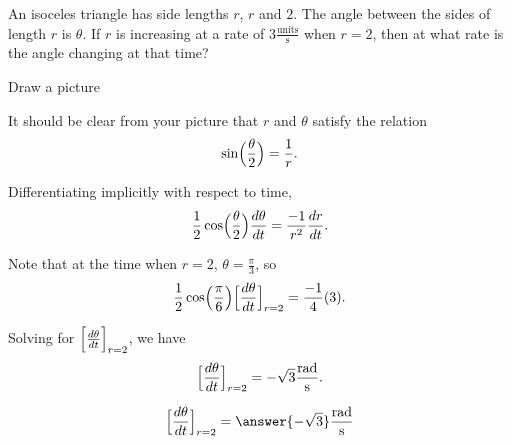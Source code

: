 \documentclass{ximera}
\author{Steven Gubkin\and Nela Lakos}
\begin{document}
\begin{exercise}

An isoceles triangle has side lengths $r$, $r$ and $2$.  The angle
between the sides of length $r$ is $\theta$.  If $r$ is increasing at
a rate of $3 \frac{\textrm{units}}{\textrm{s}}$ when $r = 2$, then at
what rate is the angle changing at that time?

\begin{hint}
  Draw a picture
\end{hint}

\begin{hint}
  It should be clear from your picture that $r$ and $\theta$ satisfy the relation 
  \[
  \sin\Bigl(\frac{\theta}{2}\Bigr) = \frac{1}{r}.
  \]
\end{hint}

\begin{hint}
  Differentiating implicitly with respect to time, 
  \[
  \frac{1}{2}\cos\Bigl(\frac{\theta}{2}\Bigr) \dd[\theta]{t} = \frac{-1}{r^2}
  \dd[r]{t}.
  \]
\end{hint}

\begin{hint}
  Note that at the time when $r = 2$, $\theta = \frac{\pi}{3}$, so
  \[
  \frac{1}{2} \cos\Bigl(\frac{\pi}{6}\Bigr)\Bigl[ \dd[\theta]{t}\Bigr]_{r=2} = \frac{-1}{4} (3).
  \]
\end{hint}

\begin{hint}
  Solving for $\Bigl[ \dd[\theta]{t}\Bigr]_{r=2} $, we have
  \[
\Bigl[ \dd[\theta]{t}\Bigr]_{r=2}  = -\sqrt{3}\frac{\textrm{rad}}{\textrm{s}}.
  \]
\end{hint}

\begin{prompt}
  \[
\Bigl[ \dd[\theta]{t}\Bigr]_{r=2}  = \answer{-\sqrt{3}}\frac{\textrm{rad}}{\textrm{s}}
  \]
\end{prompt}
\end{exercise}
\end{document}
